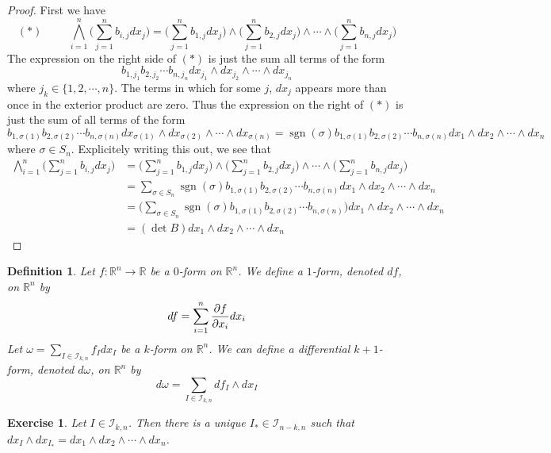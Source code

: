 \documentclass[12pt]{amsart}
\newtheorem{defn}[thm]{Definition}
\newtheorem{ex}[thm]{Exercise}
\newcommand{\sig}{\sigma}
\newcommand{\om}{\omega}
\newcommand{\R}{\mathbb{R}}
\newcommand{\MI}{\mathcal{I}}
\DeclareMathOperator{\sgn}{sgn}
\begin{document}
	\begin{proof}
		First we have $$ (*) \hspace{1cm} \bigwedge_{i=1}^n \bigg(\sum_{j=1}^n b_{i,j}dx_j\bigg) =\bigg(\sum_{j=1}^n b_{1,j}dx_j\bigg) \wedge \bigg(\sum_{j=1}^n b_{2,j}dx_j\bigg) \wedge \cdots \wedge \bigg(\sum_{j=1}^n b_{n,j}dx_j\bigg)$$ The expression on the right side of $(*)$ is just the sum all terms of the form $$b_{1,j_1}b_{2,j_2} \cdots b_{n,j_n} dx_{j_1}\wedge  dx_{j_2} \wedge \cdots \wedge  dx_{j_n}$$ where $j_k \in \{1,2,\cdots,n\}$. The terms in which for some $j$, $dx_j$ appears more than once in the exterior product are zero. Thus the expression on the right of $(*)$ is just the sum of all terms of the form $$b_{1,\sig(1)}b_{2,\sig(2)} \cdots b_{n,\sig(n)} dx_{\sig(1)}\wedge  dx_{\sig(2)} \wedge \cdots \wedge  dx_{\sig(n)} = \sgn(\sig) b_{1,\sig(1)}b_{2,\sig(2)} \cdots b_{n,\sig(n)} dx_1 \wedge dx_2 \wedge \cdots \wedge dx_n$$
		where $\sig \in S_n$. Explicitely writing this out, we see that 
		\begin{align*}
			\bigwedge_{i=1}^n \bigg(\sum_{j=1}^n b_{i,j}dx_j\bigg)
			&= \bigg(\sum_{j=1}^n b_{1,j}dx_j\bigg) \wedge \bigg(\sum_{j=1}^n b_{2,j}dx_j\bigg) \wedge \cdots \wedge \bigg(\sum_{j=1}^n b_{n,j}dx_j\bigg) \\
			&= \sum_{\sig \in S_n} \sgn(\sig) b_{1,\sig(1)}b_{2,\sig(2)} \cdots b_{n,\sig(n)} dx_1 \wedge dx_2 \wedge \cdots \wedge dx_n \\
			&= \bigg( \sum_{\sig \in S_n} \sgn(\sig) b_{1,\sig(1)}b_{2,\sig(2)} \cdots b_{n,\sig(n)}\bigg) dx_1 \wedge dx_2 \wedge \cdots \wedge dx_n \\
			&= (\det B) dx_1 \wedge dx_2 \wedge \cdots \wedge dx_n
		\end{align*}
	\end{proof}

	\begin{defn}
		Let $f: \R^n \rightarrow \R$ be a $0$-form on $\R^n$. We define a $1$-form, denoted $df$, on $\R^n$ by $$df = \sum_{i = 1}^n \pdv{f}{x_i} dx_i$$
		Let $\om = \sum\limits_{I \in \MI_{k,n}} f_Idx_I$ be a $k$-form on $\R^n$. We can define a differential $k+1$-form, denoted $d \om$, on $\R^n$ by $$d\om = \sum\limits_{I \in \MI_{k,n}} df_I\wedge dx_I$$  
	\end{defn}

	\begin{ex}
		Let $I \in \MI_{k, n}$. Then there is a unique $I_* \in \MI_{n-k, n}$ such that $dx_I \wedge dx_{I_*} = dx_1 \wedge dx_2 \wedge \cdots \wedge dx_n$.
	\end{ex}
	
\end{document}
